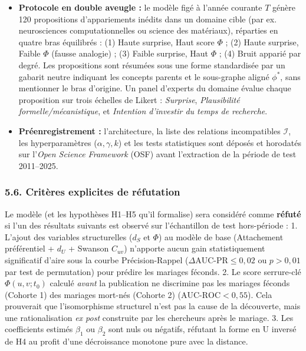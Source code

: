 \documentclass[a4paper,11pt]{article}
\providecommand{\tightlist}{\setlength{\itemsep}{0pt}\setlength{\parskip}{0pt}}
\begin{document}
\begin{itemize}
\tightlist
\item
  \textbf{Protocole en double aveugle :} le modèle figé à l'année
  courante \(T\) génère 120 propositions d'appariements inédits dans un
  domaine cible (par ex. neurosciences computationnelles ou science des
  matériaux), réparties en quatre bras équilibrés : (1) Haute surprise,
  Haut score \(\Phi\) ; (2) Haute surprise, Faible \(\Phi\) (fausse
  analogie) ; (3) Faible surprise, Haut \(\Phi\) ; (4) Bruit apparié par
  degré. Les propositions sont résumées sous une forme standardisée par
  un gabarit neutre indiquant les concepts parents et le sous-graphe
  aligné \(\phi^*\), sans mentionner le bras d'origine. Un panel
  d'experts du domaine évalue chaque proposition sur trois échelles de
  Likert : \emph{Surprise}, \emph{Plausibilité formelle/mécanistique},
  et \emph{Intention d'investir du temps de recherche}.
\item
  \textbf{Préenregistrement :} l'architecture, la liste des relations
  incompatibles \(\mathcal{I}\), les hyperparamètres
  (\(\alpha, \gamma, k\)) et les tests statistiques sont déposés et
  horodatés sur l'\emph{Open Science Framework} (OSF) avant l'extraction
  de la période de test 2011--2025.
\end{itemize}

\subsubsection*{5.6. Critères explicites de réfutation}

Le modèle (et les hypothèses H1--H5 qu'il formalise) sera considéré
comme \textbf{réfuté} si l'un des résultats suivants est observé sur
l'échantillon de test hors-période : 1. L'ajout des variables
structurelles (\(d_S\) et \(\Phi\)) au modèle de base (Attachement
préférentiel + \(d_U\) + Swanson \(C_{uv}\)) n'apporte aucun gain
statistiquement significatif d'aire sous la courbe Précision-Rappel
(\(\Delta \text{AUC-PR} \le 0,02\) ou \(p > 0,01\) par test de
permutation) pour prédire les mariages féconds. 2. Le score serrure-clé
\(\Phi(u,v;t_0)\) calculé \emph{avant} la publication ne discrimine pas
les mariages féconds (Cohorte 1) des mariages mort-nés (Cohorte 2)
(\(\text{AUC-ROC} < 0,55\)). Cela prouverait que l'isomorphisme
structurel n'est pas la cause de la découverte, mais une rationalisation
\emph{ex post} construite par les chercheurs après le mariage. 3. Les
coefficients estimés \(\beta_1\) ou \(\beta_2\) sont nuls ou négatifs,
réfutant la forme en U inversé de H4 au profit d'une décroissance
monotone pure avec la distance.
\end{document}
